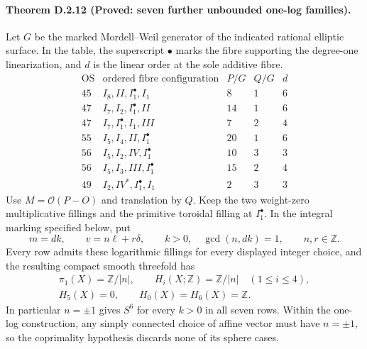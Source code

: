 \paragraph{Theorem D.2.12 (Proved: seven further unbounded one-log families).}
Let $G$ be the marked Mordell--Weil generator of the indicated
rational elliptic surface. In the table, the superscript $\bullet$
marks the fibre supporting the degree-one linearization, and $d$
is the linear order at the sole additive fibre.
\[
 \begin{array}{c|l|rr|r}
 \mathrm{OS}&\text{ordered fibre configuration}&P/G&Q/G&d\\\hline
 45&I_8,II,I_1^\bullet,I_1&8&1&6\\
 47&I_7,I_2,I_1^\bullet,II&14&1&6\\
 47&I_7,I_1^\bullet,I_1,III&7&2&4\\
 55&I_5,I_4,II,I_1^\bullet&20&1&6\\
 56&I_5,I_2,IV,I_1^\bullet&10&3&3\\
 56&I_5,I_3,III,I_1^\bullet&15&2&4\\
 49&I_2,IV^*,I_1^\bullet,I_1&2&3&3
 \end{array}
\]
Use $M=\mathcal O(P-O)$ and translation by $Q$.
Keep the two weight-zero multiplicative fillings and the
primitive toroidal filling at $I_1^\bullet$.
In the integral marking specified below, put
\[
 m=dk,\qquad v=n\ell+r\delta,
 \qquad k>0,\quad\gcd(n,dk)=1,
 \qquad n,r\in\mathbb Z.
\]
Every row admits these logarithmic fillings for every displayed
integer choice, and the resulting compact smooth threefold has
\[
 \begin{gathered}
 \pi_1(X)=\mathbb Z/|n|,\qquad
 H_i(X;\mathbb Z)=\mathbb Z/|n|\quad(1\leq i\leq4),\\
 H_5(X)=0,\qquad H_0(X)=H_6(X)=\mathbb Z.
 \end{gathered}
\]
In particular $n=\pm1$ gives $S^6$ for every $k>0$ in all seven
rows. Within the one-log construction, any simply connected
choice of affine vector must have $n=\pm1$, so the coprimality
hypothesis discards none of its sphere cases.
